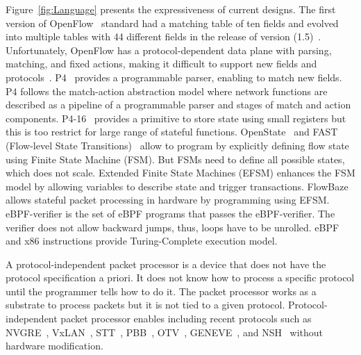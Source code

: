 Figure~\ref{fig:Language} presents the expressiveness of current designs. The first version of OpenFlow~\cite{McKeown:2008:OpenFlow} standard had a matching table of ten fields and evolved into multiple tables with 44 different fields in the release of version (1.5)~\cite{ChristianSurveySDN2015}. Unfortunately, OpenFlow has a protocol-dependent data plane with parsing, matching, and fixed actions, making it difficult to support new fields and 
protocols~\cite{Jouet:2017:BPFabric}.
P4~\cite{Bosshart:2014:P4} provides a programmable parser, enabling to match new fields. P4 follows the match-action abstraction model where network functions are described as a pipeline of a programmable parser and stages of match and action components. P4-16~\cite{P4-16} provides a primitive to store state using small registers but this is too restrict for large range of stateful functions. OpenState~\cite{Bianchi:2014:OPP:2602204.2602211} and FAST (Flow-level State Transitions)~\cite{Moshref:2014:FST:2620728.2620729} allow to program by explicitly defining flow state using Finite State Machine (FSM). But FSMs need to define all possible states, which does not scale. Extended Finite State Machines (EFSM) enhances the FSM model by allowing variables to describe state and trigger transactions. FlowBaze~\cite{FlowBlaze2019} allows stateful packet processing in hardware by programming using EFSM.  eBPF-verifier is the set of eBPF programs that passes the eBPF-verifier. The verifier does not allow backward jumps, thus, loops have to be unrolled. eBPF and x86 instructions provide Turing-Complete execution model.

A protocol-independent packet processor is a device that does not have the protocol specification a priori. It does not know how to process a specific protocol until the programmer tells how to do it. The packet processor works as a substrate to process packets but it is not tied to a given protocol. Protocol-independent packet processor enables including recent protocols such as NVGRE~\cite{rfc7637}, VxLAN~\cite{mahalingam2013}, STT~\cite{davie2014stt}, PBB~\cite{kishjac-bmwg-evpntest-08}, OTV~\cite{hasmit-otv-04}, GENEVE~\cite{ietf-nvo3-geneve-05}, and NSH~\cite{rfc8300} without hardware modification.

